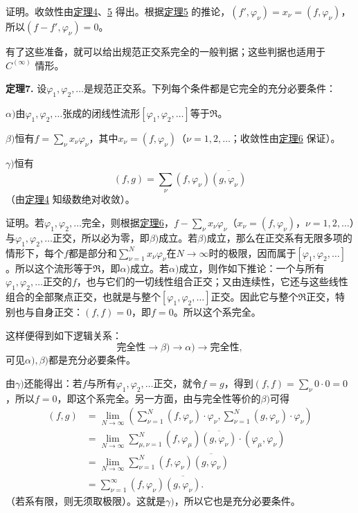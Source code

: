 \documentclass[fontsize=13pt,twoside,openany,headings=normal,parskip=false,bookmarkpackage=false,DIV=calc]{scrbook}
\newcommand{\textkaishu}[1]{{\zhkaishu #1}}
\begin{document}
\textkaishu{证明。}收敛性由\CJKglue \hyperref[thm:II.4]{定理4}、\hyperref[thm:II.5]{5} 得出。根据\CJKglue \hyperref[thm:II.5]{定理5} 的推论，$(f',\allowbreak \varphi_\nu)=x_\nu=(f,\allowbreak \varphi_\nu)$，所以$(f-f',\allowbreak \varphi_\nu)=0$。

有了这些准备，就可以给出规范正交系完全的一般判据；这些判据也适用于 \hyperref[ax:II.Cinfty]{$C^{(\infty)}$} 情形。

\leavevmode{}\textbf{定理7.}\label{thm:II.7} 设$\varphi_1,\allowbreak \varphi_2,\allowbreak \ldots$是规范正交系。下列每个条件都是它完全的充分必要条件：

$\alpha)$由$\varphi_1,\allowbreak \varphi_2,\allowbreak \ldots$张成的闭线性流形$[\varphi_1,\allowbreak \varphi_2,\allowbreak \ldots]$等于$\mathfrak{R}$。

$\beta)$恒有$f=\sum_\nu x_\nu\varphi_\nu$，其中$x_\nu=(f,\allowbreak \varphi_\nu)$（$\nu=1,\allowbreak 2,\allowbreak \ldots$；收敛性由\CJKglue \hyperref[thm:II.6]{定理6} 保证）。

$\gamma)$恒有
\[
(f,g)=\sum_\nu(f,\varphi_\nu)\overline{(g,\varphi_\nu)}
\]
（由\CJKglue \hyperref[thm:II.4]{定理4} 知级数绝对收敛）。

\textkaishu{证明。}若$\varphi_1,\allowbreak \varphi_2,\allowbreak \ldots$完全，则根据\CJKglue \hyperref[thm:II.6]{定理6}，$f-\sum_\nu x_\nu\varphi_\nu$（$x_\nu=(f,\allowbreak \varphi_\nu)$，$\nu=1,\allowbreak 2,\allowbreak \ldots$）与$\varphi_1,\allowbreak \varphi_2,\allowbreak \ldots$正交，所以必为零，即$\beta)$成立。若$\beta)$成立，那么在正交系有无限多项的情形下，每个$f$都是部分和$\sum_{\nu=1}^Nx_\nu\varphi_\nu$在$N\to\infty$时的极限，因而属于$[\varphi_1,\allowbreak \varphi_2,\allowbreak \ldots]$。所以这个流形等于$\mathfrak{R}$，即$\alpha)$成立。若$\alpha)$成立，则作如下推论：一个与所有$\varphi_1,\allowbreak \varphi_2,\allowbreak \ldots$正交的$f$，也与它们的一切线性组合正交；又由连续性，它还与这些线性组合的全部聚点正交，也就是与整个$[\varphi_1,\allowbreak \varphi_2,\allowbreak \ldots]$正交。因此它与整个$\mathfrak{R}$正交，特别也与自身正交：$(f,\allowbreak f)=0$，即$f=0$。所以这个系完全。

这样便得到如下逻辑关系：
\[
\text{完全性}\longrightarrow\beta)\longrightarrow\alpha)
\longrightarrow\text{完全性},
\]
可见$\alpha),\allowbreak \beta)$都是充分必要条件。

由$\gamma)$还能得出：若$f$与所有$\varphi_1,\allowbreak \varphi_2,\allowbreak \ldots$正交，就令$f=g$，得到$(f,\allowbreak f)=\sum_\nu0\cdot0=0$，所以$f=0$，即这个系完全。\hypertarget{origpage-29}{}\label{origpage-29}另一方面，由与完全性等价的$\beta)$可得
\begin{align*}
(f,g)&=\lim_{N\to\infty}
\left(\sum_{\nu=1}^N(f,\varphi_\nu)\cdot\varphi_\nu,
\sum_{\nu=1}^N(g,\varphi_\nu)\cdot\varphi_\nu\right)\\
&=\lim_{N\to\infty}\sum_{\mu,\nu=1}^N
(f,\varphi_\mu)\overline{(g,\varphi_\nu)}\cdot(\varphi_\mu,\varphi_\nu)\\
&=\lim_{N\to\infty}\sum_{\nu=1}^N
(f,\varphi_\nu)\overline{(g,\varphi_\nu)}\\
&=\sum_{\nu=1}^\infty(f,\varphi_\nu)\overline{(g,\varphi_\nu)}.
\end{align*}
（若系有限，则无须取极限）。这就是$\gamma)$，所以它也是充分必要条件。
\end{document}
